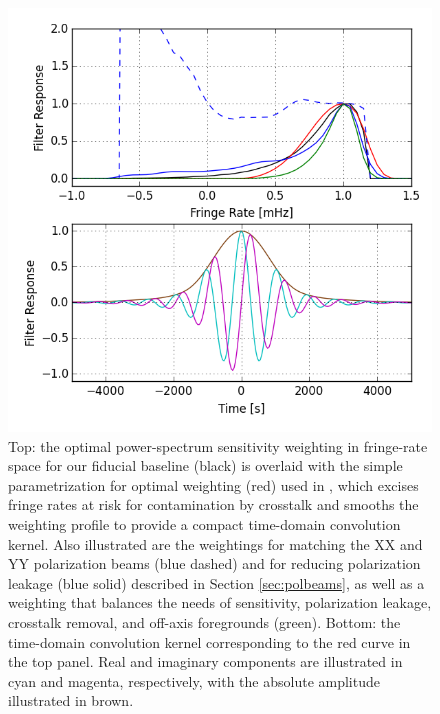 \documentclass[twocolumn,apj,numberedappendix]{emulateapj}
\begin{document}
\begin{figure}[!t]
\centering
\includegraphics[width=\columnwidth]{plots/fringe_rate_cut.png}
\caption{
Top: the optimal power-spectrum sensitivity weighting in fringe-rate space 
for our fiducial baseline (black) is overlaid with
the simple parametrization for optimal weighting (red) used in \citet{ali_et_al2015},
which excises fringe rates at risk for contamination by crosstalk and smooths the
weighting profile to provide a compact time-domain convolution kernel.  Also illustrated
are the weightings for matching the XX and YY polarization beams (blue dashed) and
for reducing polarization leakage (blue solid) described in Section \ref{sec:polbeams}, as well
as a weighting that balances the needs of sensitivity, polarization leakage, crosstalk
removal, and off-axis foregrounds (green).  Bottom: the time-domain convolution kernel
corresponding to the red curve in the top panel.  Real and imaginary components are
illustrated in cyan and magenta, respectively, with the absolute amplitude illustrated
in brown.
}
\label{fig:fringe_rate_cut}
\end{figure}
\end{document}
